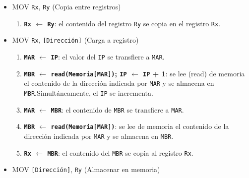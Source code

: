 \documentclass[12pt,oneside]{templates/unerthesis}
\providecommand{\tightlist}{%
  \setlength{\itemsep}{0pt}\setlength{\parskip}{0pt}}
\begin{document}
\begin{itemize}
\tightlist
\item
  MOV \texttt{Rx}, \texttt{Ry} (Copia entre registros)

  \begin{enumerate}
  \def\labelenumi{\arabic{enumi}.}
  \tightlist
  \item
    \textbf{\texttt{Rx} \(\leftarrow\) \texttt{Ry}}:
    el contenido del registro \texttt{Ry} se copia en el registro \texttt{Rx}.
  \end{enumerate}
\item
  MOV \texttt{Rx}, \texttt{{[}Dirección{]}} (Carga a registro)

  \begin{enumerate}
  \def\labelenumi{\arabic{enumi}.}
  \tightlist
  \item
    \textbf{\texttt{MAR} \(\leftarrow\) \texttt{IP}}:
    el valor del \texttt{IP} se transfiere a \texttt{MAR}.
  \item
    \textbf{\texttt{MBR} \(\leftarrow\) \texttt{read(Memoria{[}MAR{]})}; \texttt{IP} \(\leftarrow\) \texttt{IP} + 1}:
    se lee (read) de memoria el contenido de la dirección indicada por \texttt{MAR} y se almacena en \texttt{MBR}.Simultáneamente, el \texttt{IP} se incrementa.
  \item
    \textbf{\texttt{MAR} \(\leftarrow\) \texttt{MBR}}:
    el contenido de \texttt{MBR} se transfiere a \texttt{MAR}.
  \item
    \textbf{\texttt{MBR} \(\leftarrow\) \texttt{read(Memoria{[}MAR{]})}}:
    se lee de memoria el contenido de la dirección indicada por \texttt{MAR} y se almacena en \texttt{MBR}.
  \item
    \textbf{\texttt{Rx} \(\leftarrow\) \texttt{MBR}}:
    el contenido del \texttt{MBR} se copia al registro \texttt{Rx}.
  \end{enumerate}
\item
  MOV \texttt{{[}Dirección{]}}, \texttt{Ry} (Almacenar en memoria)


\end{itemize}
\end{document}
